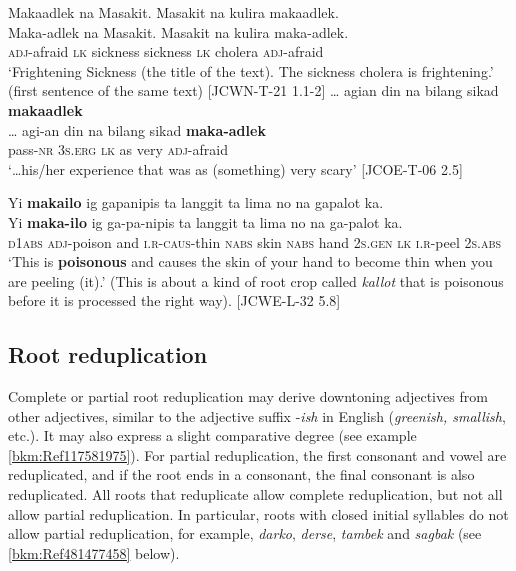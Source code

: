 \ea
\label{bkm:Ref117581373}
Makaadlek  na  Masakit.  Masakit  na  kulira  makaadlek. \\\smallskip
 \gll Maka-adlek  na  Masakit.  Masakit  na  kulira  maka-adlek. \\
\textsc{adj}-afraid  \textsc{lk}  sickness  sickness  \textsc{lk}  cholera  \textsc{adj}-afraid \\
\glt ‘Frightening Sickness (the title of the text). The sickness cholera is frightening.' (first sentence of the same text) [JCWN-T-21 1.1-2]
\z
\ea
…  agian  din  na  bilang  sikad  \textbf{makaadlek} \\\smallskip
 \gll …  agi-an  din  na  bilang  sikad  \textbf{maka-adlek} \\
{} pass-\textsc{nr}  3\textsc{s.erg}  \textsc{lk}  as  very  \textsc{adj}-afraid \\
\glt ‘…his/her experience that was as (something) very scary’ [JCOE-T-06 2.5]
\z

\newpage
\ea
\label{bkm:Ref117580692}
Yi  \textbf{makailo}  ig  gapanipis  ta  langgit  ta  lima  no  na  gapalot  ka. \\\smallskip
 \gll Yi  \textbf{maka-ilo}  ig\footnotemark{}  ga-pa-nipis  ta  langgit  ta  lima  no  na  ga-palot  ka. \\
\textsc{d}1\textsc{abs}  \textsc{adj}-poison  and  \textsc{i.r}-\textsc{caus}-thin  \textsc{nabs}  skin  \textsc{nabs}  hand  2\textsc{s.gen}
\textsc{lk}  \textsc{i.r}-peel  2\textsc{s.abs} \\
\glt `This is \textbf{poisonous} and causes the skin of your hand to become thin when you are peeling (it).’ (This is about a kind of root crop called \textit{kallot} that is poisonous before it is processed the right way). [JCWE-L-32 5.8]
\z
\subsection{Root reduplication}
\label{sec:rootreduplication-derivation}

Complete or partial root reduplication may derive downtoning adjectives from other adjectives, similar to the adjective suffix -\textit{ish} in English (\textit{greenish, smallish}, etc.). It may also express a slight comparative degree (see example \ref{bkm:Ref117581975}). For partial reduplication, the first consonant and vowel are reduplicated, and if the root ends in a consonant, the final consonant is also reduplicated. All roots that reduplicate allow complete reduplication, but not all allow partial reduplication. In particular, roots with closed initial syllables do not allow partial reduplication, for example, \textit{darko}, \textit{derse}, \textit{tambek} and \textit{sagbak} (see \ref{bkm:Ref481477458} below).

